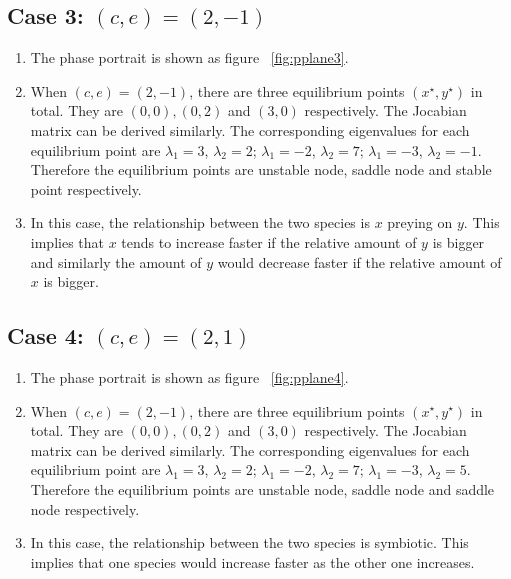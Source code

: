 \subsection*{Case 3: $(c,e)=(2,-1)$}
\begin{enumerate}
\item The phase portrait is shown as figure ~\ref{fig:pplane3}.
\item When $(c,e)=(2,-1)$, there are three equilibrium points $(x^\star,y^\star)$ in total. They are $(0,0),(0,2)$ and $(3,0)$ respectively. The Jocabian matrix can be derived similarly. The corresponding eigenvalues for each equilibrium point are $\lambda_{1} = 3$, $\lambda_{2} = 2$; $\lambda_1 = -2$, $\lambda_2 = 7$; $\lambda_1 = -3$, $\lambda_2 = -1$. Therefore the equilibrium points are unstable node, saddle node and stable point respectively. 
\item In this case, the relationship between the two species is $x$ preying on $y$. This implies that $x$ tends to increase faster if the relative amount of $y$ is bigger and similarly the amount of $y$ would decrease faster if the relative amount of $x$ is bigger.   
\end{enumerate}

\subsection*{Case 4: $(c,e)=(2,1)$}
\begin{enumerate}
\item The phase portrait is shown as figure ~\ref{fig:pplane4}. 
\item When $(c,e)=(2,-1)$, there are three equilibrium points $(x^\star,y^\star)$ in total. They are $(0,0),(0,2)$ and $(3,0)$ respectively. The Jocabian matrix can be derived similarly. The corresponding eigenvalues for each equilibrium point are $\lambda_{1} = 3$, $\lambda_{2} = 2$; $\lambda_1 = -2$, $\lambda_2 = 7$; $\lambda_1 = -3$, $\lambda_2 = 5$. Therefore the equilibrium points are unstable node, saddle node and saddle node respectively. 
\item In this case, the relationship between the two species is symbiotic. This implies that one species would increase faster as the other one increases. 
\end{enumerate}